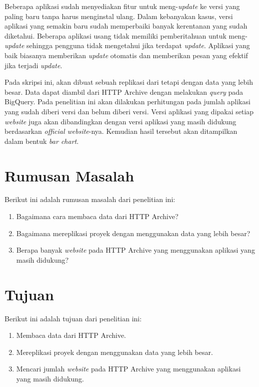 Beberapa aplikasi sudah menyediakan fitur untuk meng-\textit{update} ke versi yang paling baru tanpa harus menginstal ulang. Dalam kebanyakan kasus, versi aplikasi yang semakin baru sudah memperbaiki banyak kerentanan yang sudah diketahui. Beberapa aplikasi usang tidak memiliki pemberitahuan untuk meng-\textit{update} sehingga pengguna tidak mengetahui jika terdapat \textit{update}. Aplikasi yang baik biasanya memberikan \textit{update} otomatis dan memberikan pesan yang efektif jika terjadi \textit{update}. 

Pada skripsi ini, akan dibuat sebuah replikasi dari \cite{pascal} tetapi dengan data yang lebih besar. Data dapat diambil dari HTTP Archive dengan melakukan \textit{query} pada BigQuery. Pada penelitian ini akan dilakukan perhitungan pada jumlah aplikasi yang sudah diberi versi dan belum diberi versi. Versi aplikasi yang dipakai setiap \textit{website} juga akan dibandingkan dengan versi aplikasi yang masih didukung berdasarkan \textit{official website}-nya. Kemudian hasil tersebut akan ditampilkan dalam bentuk \textit{bar chart}.


\section{Rumusan Masalah}
\label{sec:rumusan}
Berikut ini adalah rumusan masalah dari penelitian ini:
\begin{enumerate}
	\item Bagaimana cara membaca data dari HTTP Archive?
	\item Bagaimana mereplikasi proyek \cite{pascal} dengan menggunakan data yang lebih besar?
	\item Berapa banyak \textit{website} pada HTTP Archive yang menggunakan aplikasi  yang masih didukung?
\end{enumerate}


\section{Tujuan}
\label{sec:tujuan}
Berikut ini adalah tujuan dari penelitian ini:
\begin{enumerate}
	\item Membaca data dari HTTP Archive.
	\item Mereplikasi proyek \cite{pascal} dengan menggunakan data yang lebih besar.
	\item Mencari jumlah \textit{website} pada HTTP Archive yang menggunakan aplikasi yang masih didukung.
\end{enumerate}


